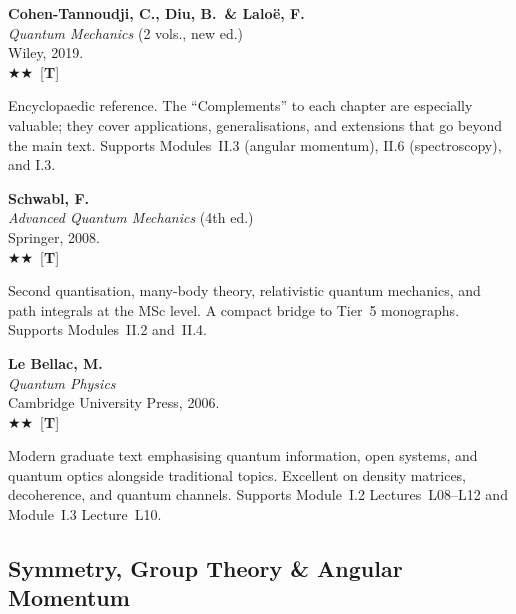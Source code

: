 \documentclass[11pt,a4paper]{article}
\newcommand{\recommended}{$\bigstar\bigstar$}
\newenvironment{bibentry}[1]{\begin{tcolorbox}[entrybox=#1,top=4pt,bottom=4pt]}{\end{tcolorbox}\smallskip}
\begin{document}
\begin{bibentry}{t4light}
\textbf{Cohen-Tannoudji, C., Diu, B.\ \& Lalo\"e, F.}\\
\textit{Quantum Mechanics} (2 vols., new ed.)\\
Wiley, 2019.\\[3pt]
\recommended\ [\textbf{T}]\\[3pt]
\begin{tcolorbox}[annotbox]
Encyclopaedic reference. The ``Complements'' to each chapter are especially valuable;
they cover applications, generalisations, and extensions that go beyond the main text.
Supports Modules~II.3 (angular momentum), II.6 (spectroscopy), and I.3.
\end{tcolorbox}
\end{bibentry}

\begin{bibentry}{t4light}
\textbf{Schwabl, F.}\\
\textit{Advanced Quantum Mechanics} (4th ed.)\\
Springer, 2008.\\[3pt]
\recommended\ [\textbf{T}]\\[3pt]
\begin{tcolorbox}[annotbox]
Second quantisation, many-body theory, relativistic quantum mechanics, and path
integrals at the MSc level. A compact bridge to Tier~5 monographs. Supports
Modules~II.2 and~II.4.
\end{tcolorbox}
\end{bibentry}

\begin{bibentry}{t4light}
\textbf{Le Bellac, M.}\\
\textit{Quantum Physics}\\
Cambridge University Press, 2006.\\[3pt]
\recommended\ [\textbf{T}]\\[3pt]
\begin{tcolorbox}[annotbox]
Modern graduate text emphasising quantum information, open systems, and quantum
optics alongside traditional topics. Excellent on density matrices, decoherence, and
quantum channels. Supports Module~I.2 Lectures~L08--L12 and Module~I.3 Lecture~L10.
\end{tcolorbox}
\end{bibentry}

\subsection{Symmetry, Group Theory \& Angular Momentum}
\end{document}
